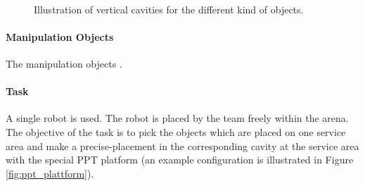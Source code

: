 \begin{figure} [h!]
\begin{center}
 \\
\end{center}
\caption{Illustration of vertical cavities for the different kind of objects.}
\label{fig:ppt_horizontal_tiles}
\end{figure}

\paragraph{Manipulation Objects}
The  manipulation objects .

\paragraph{Task}
A single robot is used. The robot is placed by the team freely within the arena. The objective of the task is to pick the objects which are placed on one service area and make a precise-placement in the corresponding cavity at the service area with the special PPT platform (an example configuration is illustrated in Figure \ref{fig:ppt_plattform}). 

